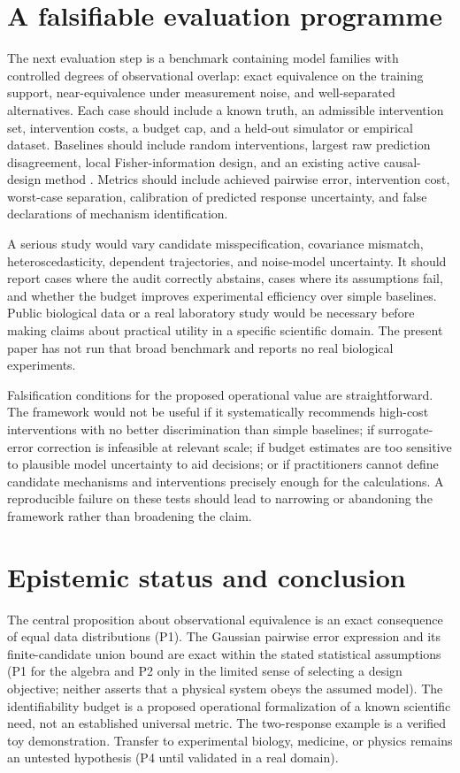 \documentclass[11pt]{article}
\begin{document}
\section{A falsifiable evaluation programme}
The next evaluation step is a benchmark containing model families with controlled degrees of observational overlap: exact equivalence on the training support, near-equivalence under measurement noise, and well-separated alternatives. Each case should include a known truth, an admissible intervention set, intervention costs, a budget cap, and a held-out simulator or empirical dataset. Baselines should include random interventions, largest raw prediction disagreement, local Fisher-information design, and an existing active causal-design method \citep{zhang2023,liu2026}. Metrics should include achieved pairwise error, intervention cost, worst-case separation, calibration of predicted response uncertainty, and false declarations of mechanism identification.

A serious study would vary candidate misspecification, covariance mismatch, heteroscedasticity, dependent trajectories, and noise-model uncertainty. It should report cases where the audit correctly abstains, cases where its assumptions fail, and whether the budget improves experimental efficiency over simple baselines. Public biological data or a real laboratory study would be necessary before making claims about practical utility in a specific scientific domain. The present paper has not run that broad benchmark and reports no real biological experiments.

Falsification conditions for the proposed operational value are straightforward. The framework would not be useful if it systematically recommends high-cost interventions with no better discrimination than simple baselines; if surrogate-error correction is infeasible at relevant scale; if budget estimates are too sensitive to plausible model uncertainty to aid decisions; or if practitioners cannot define candidate mechanisms and interventions precisely enough for the calculations. A reproducible failure on these tests should lead to narrowing or abandoning the framework rather than broadening the claim.

\section{Epistemic status and conclusion}
The central proposition about observational equivalence is an exact consequence of equal data distributions (P1). The Gaussian pairwise error expression and its finite-candidate union bound are exact within the stated statistical assumptions (P1 for the algebra and P2 only in the limited sense of selecting a design objective; neither asserts that a physical system obeys the assumed model). The identifiability budget is a proposed operational formalization of a known scientific need, not an established universal metric. The two-response example is a verified toy demonstration. Transfer to experimental biology, medicine, or physics remains an untested hypothesis (P4 until validated in a real domain).
\end{document}
